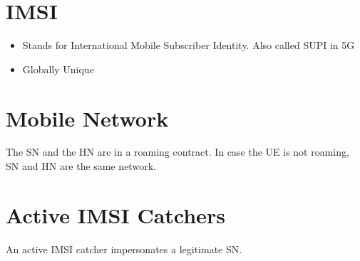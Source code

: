 \documentclass[portrait,a0]{a0poster}
\begin{document}
\begin{multicols}{2} %

\section{IMSI}

\begin{itemize} \Large
 \item Stands for International Mobile Subscriber Identity. Also called SUPI in 5G
 \item Globally Unique
\end{itemize}


\begin{center}
    
\end{center}


\section{Mobile Network}
The SN and the HN are in a roaming contract. In case the UE is not roaming, SN and HN are the same network.

\begin{center}
    
\end{center}




%    

                                                                                                                                                                     


\section{Active IMSI Catchers}

An active IMSI catcher impersonates a legitimate SN.



\end{multicols}
\end{document}
